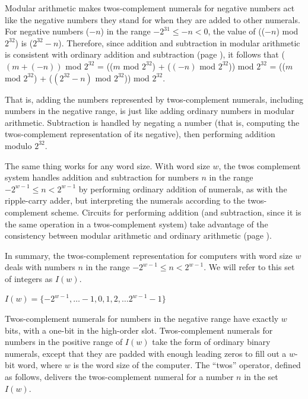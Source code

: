 Modular arithmetic makes twos-complement numerals
for negative numbers act like the negative numbers they stand for
when they are added to other numerals.
For negative numbers ($-n$) in the range $-2^{31} \le -n < 0$,
the value of (($-n$) mod $2^{32}$) is ($2^{32}-n$).
Therefore, since addition and subtraction
in modular arithmetic is consistent with ordinary addition and subtraction
(page \pageref{modular-arithmetic}), it follows that
  ($(m+(-n))$ mod $2^{32}$
= (($m$ mod $2^{32}$) + ($(-n)$ mod $2^{32}$)) mod $2^{32}$
= (($m$ mod $2^{32}$) + ($(2^{32} - n)$ mod $2^{32}$)) mod $2^{32}$.

That is, adding the numbers represented by twos-complement
numerals, including numbers in the negative range,
is just like adding ordinary numbers in modular arithmetic.
Subtraction is handled by negating a number
(that is, computing the twos-complement representation
of its negative), then performing addition modulo $2^{32}$.

The same thing works for any word size.
With word size $w$, the twos complement system
handles addition and subtraction for numbers $n$
in the range $-2^{w-1} \leq n < 2^{w-1}$
by performing ordinary addition of numerals,
as with the ripple-carry adder, but interpreting
the numerals according to the twos-complement scheme.
Circuits for performing addition (and subtraction, since
it is the same operation in a twos-complement system)
take advantage of the consistency between modular arithmetic
and ordinary arithmetic (page \pageref{modular-arithmetic}).

In summary, the twos-complement representation for computers with
word size $w$ deals with numbers $n$ in the range
$-2^{w-1} \leq n < 2^{w-1}$.
We will refer to this set of integers as $I(w)$.
\label{def-Iw}
\begin{center}
$I(w) = \{-2^{w-1}, \dots -1, 0, 1, 2, \dots 2^{w-1}-1\}$
\end{center}

Twos-complement numerals for numbers in the negative range
have exactly $w$ bits, with a one-bit in the high-order slot.
Twos-complement numerals for numbers in the positive range of $I(w)$
take the form of ordinary binary numerals, except that
they are padded with enough leading zeros
to fill out a $w$-bit word, where $w$ is the word size of the computer.
The ``twos'' operator, defined as follows, delivers the twos-complement numeral
for a number $n$ in the set $I(w)$.

